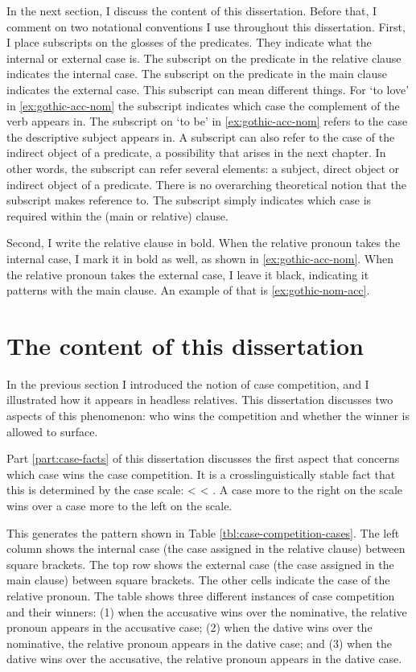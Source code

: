 In the next section, I discuss the content of this dissertation. Before that, I comment on two notational conventions I use throughout this dissertation. First, I place subscripts on the glosses of the predicates. They indicate what the internal or external case is. The subscript on the predicate in the relative clause indicates the internal case. The subscript on the predicate in the main clause indicates the external case. This subscript can mean different things.
For  `to love' in \ref{ex:gothic-acc-nom} the subscript indicates which case the complement of the verb appears in. The subscript on  `to be' in \ref{ex:gothic-acc-nom} refers to the case the descriptive subject appears in. A subscript can also refer to the case of the indirect object of a predicate, a possibility that arises in the next chapter.
In other words, the subscript can refer several elements: a subject, direct object or indirect object of a predicate. There is no overarching theoretical notion that the subscript makes reference to. The subscript simply indicates which case is required within the (main or relative) clause.

Second, I write the relative clause in bold. When the relative pronoun takes the internal case, I mark it in bold as well, as shown in \ref{ex:gothic-acc-nom}. When the relative pronoun takes the external case, I leave it black, indicating it patterns with the main clause. An example of that is \ref{ex:gothic-nom-acc}.


\section{The content of this dissertation}

In the previous section I introduced the notion of case competition, and I illustrated how it appears in headless relatives. This dissertation discusses two aspects of this phenomenon: who wins the competition and whether the winner is allowed to surface.

Part \ref{part:case-facts} of this dissertation discusses the first aspect that concerns which case wins the case competition. It is a crosslinguistically stable fact that this is determined by the case scale:  <  <  \citep[cf.][]{grosu1994}. A case more to the right on the scale wins over a case more to the left on the scale.

This generates the pattern shown in Table \ref{tbl:case-competition-cases}. The left column shows the internal case (the case assigned in the relative clause) between square brackets. The top row shows the external case (the case assigned in the main clause) between square brackets. The other cells indicate the case of the relative pronoun. The table shows three different instances of case competition and their winners: (1) when the accusative wins over the nominative, the relative pronoun appears in the accusative case; (2) when the dative wins over the nominative, the relative pronoun appears in the dative case; and (3) when the dative wins over the accusative, the relative pronoun appears in the dative case.

